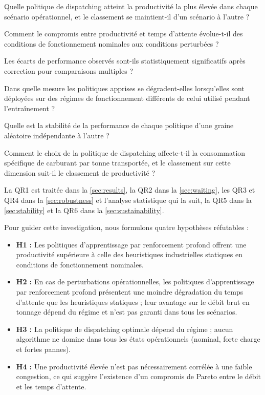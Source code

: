 \documentclass[11pt,a4paper]{article}
\begin{document}
\begin{description}[leftmargin=1.2cm,labelwidth=1.0cm]

  \item[QR1] Quelle politique de dispatching atteint la productivité la plus élevée dans chaque
  scénario opérationnel, et le classement se maintient-il d'un scénario à l'autre ?

  \item[QR2] Comment le compromis entre productivité et temps d'attente évolue-t-il
  des conditions de fonctionnement nominales aux conditions perturbées ?

  \item[QR3] Les écarts de performance observés sont-ils statistiquement significatifs après
  correction pour comparaisons multiples ?

  \item[QR4] Dans quelle mesure les politiques apprises se dégradent-elles lorsqu'elles sont déployées sur des
  régimes de fonctionnement différents de celui utilisé pendant l'entraînement ?

  \item[QR5] Quelle est la stabilité de la performance de chaque politique d'une graine
  aléatoire indépendante à l'autre ?

  \item[QR6] Comment le choix de la politique de dispatching affecte-t-il la consommation spécifique de
  carburant par tonne transportée, et le classement sur cette dimension suit-il
  le classement de productivité ?

\end{description}

La QR1 est traitée dans la \cref{sec:results}, la QR2 dans la \cref{sec:waiting}, les QR3 et QR4 dans la \cref{sec:robustness} et l'analyse statistique qui la suit, la QR5 dans la \cref{sec:stability} et la QR6 dans la \cref{sec:sustainability}.

Pour guider cette investigation, nous formulons quatre hypothèses réfutables :

\begin{itemize}
  \item \textbf{H1 :} Les politiques d'apprentissage par renforcement profond offrent une productivité supérieure à celle des heuristiques industrielles statiques en conditions de fonctionnement nominales.
  \item \textbf{H2 :} En cas de perturbations opérationnelles, les politiques d'apprentissage par renforcement profond présentent une moindre dégradation du temps d'attente que les heuristiques statiques ; leur avantage sur le débit brut en tonnage dépend du régime et n'est pas garanti dans tous les scénarios.
  \item \textbf{H3 :} La politique de dispatching optimale dépend du régime ; aucun algorithme ne domine dans tous les états opérationnels (nominal, forte charge et fortes pannes).
  \item \textbf{H4 :} Une productivité élevée n'est pas nécessairement corrélée à une faible congestion, ce qui suggère l'existence d'un compromis de Pareto entre le débit et les temps d'attente.
\end{itemize}
\end{document}
